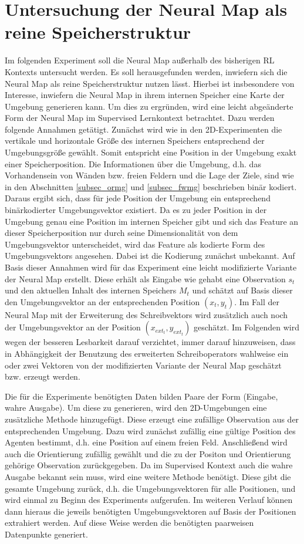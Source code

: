 \section{Untersuchung der Neural Map als reine Speicherstruktur}
\label{sec_mem_test}

Im folgenden Experiment soll die Neural Map außerhalb des bisherigen RL Kontexts untersucht werden. Es soll herausgefunden werden, inwiefern sich die Neural Map als reine Speicherstruktur nutzen lässt. Hierbei ist insbesondere von Interesse, inwiefern die Neural Map in ihrem internen Speicher eine Karte der Umgebung generieren kann. Um dies zu ergründen, wird eine leicht abgeänderte Form der Neural Map im Supervised Lernkontext betrachtet. Dazu werden folgende Annahmen getätigt. Zunächst wird wie in den 2D-Experimenten die vertikale und horizontale Größe des internen Speichers entsprechend der Umgebungsgröße gewählt. Somit entspricht eine Position in der Umgebung exakt einer Speicherposition. Die Informationen über die Umgebung, d.h. das Vorhandensein von Wänden bzw. freien Feldern und die Lage der Ziele, sind wie in den Abschnitten \ref{subsec_ormg} und \ref{subsec_fwmg} beschrieben binär kodiert. Daraus ergibt sich, dass für jede Position der Umgebung ein entsprechend binärkodierter Umgebungsvektor existiert. Da es zu jeder Position in der Umgebung genau eine Position im internen Speicher gibt und sich das Feature an dieser Speicherposition nur durch seine Dimensionalität von dem Umgebungsvektor unterscheidet, wird das Feature als kodierte Form des Umgebungsvektors angesehen. Dabei ist die Kodierung zunächst unbekannt. Auf Basis dieser Annahmen wird für das Experiment eine leicht modifizierte Variante der Neural Map erstellt. Diese erhält als Eingabe wie gehabt eine Observation $s_t$ und den aktuellen Inhalt des internen Speichers $M_t$ und schätzt auf Basis dieser den Umgebungsvektor an der entsprechenden Position $(x_t, y_t)$. Im Fall der Neural Map mit der Erweiterung des Schreibvektors wird zusätzlich auch noch der Umgebungsvektor an der Position $(x_{ext_t},y_{ext_t})$ geschätzt. Im Folgenden wird wegen der besseren Lesbarkeit darauf verzichtet, immer darauf hinzuweisen, dass in Abhängigkeit der Benutzung des erweiterten Schreiboperators wahlweise ein oder zwei Vektoren von der modifizierten Variante der Neural Map geschätzt bzw. erzeugt werden.

Die für die Experimente benötigten Daten bilden Paare der Form (Eingabe, wahre Ausgabe). Um diese zu generieren, wird den 2D-Umgebungen eine zusätzliche Methode hinzugefügt. Diese erzeugt eine zufällige Observation aus der entsprechenden Umgebung. Dazu wird zunächst zufällig eine gültige Position des Agenten bestimmt, d.h. eine Position auf einem freien Feld. Anschließend wird auch die Orientierung zufällig gewählt und die zu der Positon und Orientierung gehörige Observation zurückgegeben. Da im Supervised Kontext auch die wahre Ausgabe bekannt sein muss, wird eine weitere Methode benötigt. Diese gibt die gesamte Umgebung zurück, d.h. die Umgebungsvektoren für alle Positionen, und wird einmal zu Beginn des Experiments aufgerufen. Im weiteren Verlauf können dann hieraus die jeweils benötigten Umgebungsvektoren auf Basis der Positionen extrahiert werden. Auf diese Weise werden die benötigten paarweisen Datenpunkte generiert.

